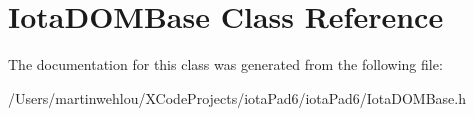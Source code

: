 \hypertarget{interface_iota_d_o_m_base}{
\section{IotaDOMBase Class Reference}
\label{interface_iota_d_o_m_base}
}


The documentation for this class was generated from the following file:\begin{DoxyCompactItemize}
\item 
/Users/martinwehlou/XCodeProjects/iotaPad6/iotaPad6/IotaDOMBase.h\end{DoxyCompactItemize}
